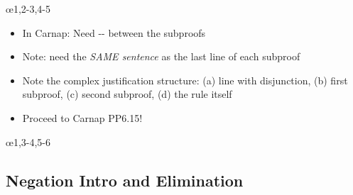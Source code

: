 \begin{frame}
  \begin{fitchproof}
     \pr{}
    \open
     
    \close
    \open
     
    \close
    \oe{1,2-3,4-5}
  \end{fitchproof}

  \begin{itemize}[<+->]
  
  \item In Carnap: Need -{}- between the subproofs

\item Note: need the \emph{SAME sentence} as the last line of each subproof

\item Note the complex justification structure: (a) line with disjunction, (b) first subproof, (c) second subproof, (d) the rule itself 

\item Proceed to Carnap PP6.15!

  \end{itemize}
\end{frame}

\begin{frame}
  \begin{fitchproof}
     \pr{}
     \pr{}
    \open
     
    \close
    \open
     
    \close
    \oe{1,3-4,5-6}
  \end{fitchproof}
\end{frame}


\subsection{Negation Intro and Elimination} 

